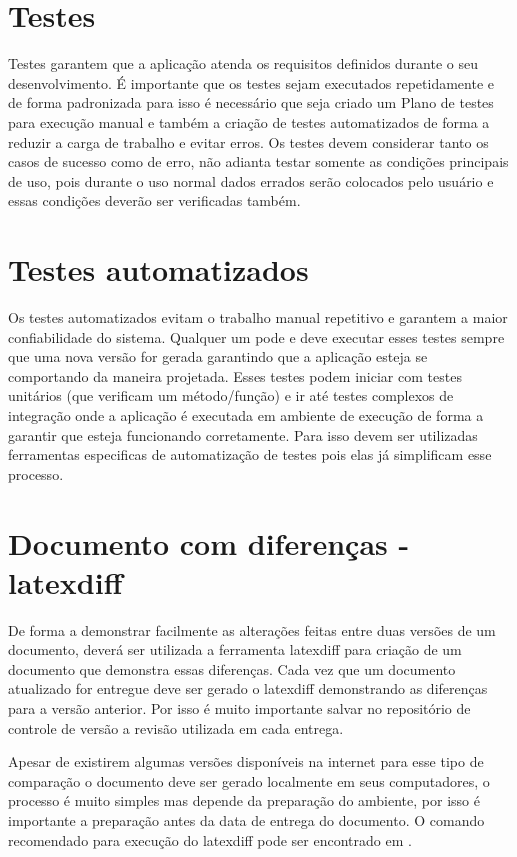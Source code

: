 \section{Testes}\label{atv-testes}
Testes garantem que a aplicação atenda os requisitos definidos durante o seu desenvolvimento. É importante que os testes sejam executados repetidamente e de forma padronizada para isso é necessário que seja criado um Plano de testes para execução manual e também a criação de testes automatizados de forma a reduzir a carga de trabalho e evitar erros. Os testes devem considerar tanto os casos de sucesso como de erro, não adianta testar somente as condições principais de uso, pois durante o uso normal dados errados serão colocados pelo usuário e essas condições deverão ser verificadas também.





\section{Testes automatizados}\label{atv-testes-automatizados}

Os testes automatizados evitam o trabalho manual repetitivo e garantem a maior confiabilidade do sistema. Qualquer um pode e deve executar esses testes sempre que uma nova versão for gerada garantindo que a aplicação esteja se comportando da maneira projetada. Esses testes podem iniciar com testes unitários (que verificam um método/função) e ir até testes complexos de integração onde a aplicação é executada em ambiente de execução de forma a garantir que esteja funcionando corretamente. Para isso devem ser utilizadas ferramentas especificas de automatização de testes pois elas já simplificam esse processo.




\section{Documento com diferenças - latexdiff}\label{atv-latexdiff}
De forma a demonstrar facilmente as alterações feitas entre duas versões de um documento, deverá ser utilizada a ferramenta \gls{latexdiff} para criação de um documento que demonstra essas diferenças. Cada vez que um documento atualizado for entregue deve ser gerado o \gls{latexdiff} demonstrando as diferenças para a versão anterior. Por isso é muito importante salvar no repositório de controle de versão a revisão utilizada em cada entrega.

Apesar de existirem algumas versões disponíveis na internet para esse tipo de comparação o documento deve ser gerado localmente em seus computadores, o processo é muito simples mas depende da preparação do ambiente, por isso é importante a preparação antes da data de entrega do documento. O comando recomendado para execução do \gls{latexdiff} pode ser encontrado em .





